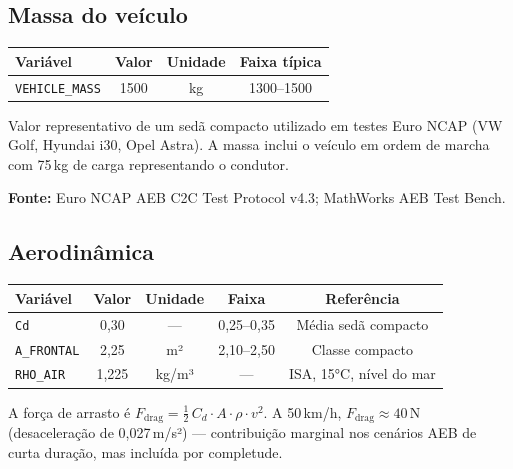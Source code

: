 \documentclass[12pt,a4paper]{article}
\newcommand{\param}[1]{\texttt{\color{laranjacode}#1}}
\begin{document}
\subsection{Massa do veículo}

\begin{table}[H]
  \centering
  \begin{tabular}{lccc}
    \toprule
    \rowcolor{azulescuro!90}
    \color{white}\textbf{Variável} & \color{white}\textbf{Valor} &
    \color{white}\textbf{Unidade} & \color{white}\textbf{Faixa típica} \\
    \midrule
    \param{VEHICLE\_MASS} & 1500 & kg & 1300--1500 \\
    \bottomrule
  \end{tabular}
\end{table}

Valor representativo de um sedã compacto utilizado em testes Euro NCAP (VW Golf,
Hyundai i30, Opel Astra). A massa inclui o veículo em ordem de marcha com 75\,kg
de carga representando o condutor.

\textbf{Fonte:} Euro NCAP AEB C2C Test Protocol v4.3; MathWorks AEB Test Bench.

\subsection{Aerodinâmica}

\begin{table}[H]
  \centering
  \begin{tabular}{lcccc}
    \toprule
    \rowcolor{azulescuro!90}
    \color{white}\textbf{Variável} & \color{white}\textbf{Valor} &
    \color{white}\textbf{Unidade} & \color{white}\textbf{Faixa} & \color{white}\textbf{Referência} \\
    \midrule
    \param{Cd}        & 0,30  & ---    & 0,25--0,35 & Média sedã compacto \\
    \rowcolor{azulclaro!50}
    \param{A\_FRONTAL} & 2,25  & m²     & 2,10--2,50 & Classe compacto \\
    \param{RHO\_AIR}  & 1,225 & kg/m³  & ---        & ISA, 15°C, nível do mar \\
    \bottomrule
  \end{tabular}
\end{table}

A força de arrasto é $F_\text{drag} = \tfrac{1}{2}\, C_d \cdot A \cdot \rho \cdot v^2$.
A 50\,km/h, $F_\text{drag} \approx 40$\,N (desaceleração de 0,027\,m/s²) --- contribuição
marginal nos cenários AEB de curta duração, mas incluída por completude.
\end{document}
